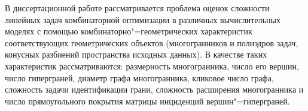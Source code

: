 
%
%



В диссертационной работе рассматривается проблема оценок сложности линейных задач комбинаторной оптимизации в различных вычислительных моделях с помощью комбинаторно"=геометрических характеристик соответствующих геометрических объектов (многогранников и полиэдров задач, конусных разбиений пространства исходных данных). В качестве таких характеристик рассматриваются: размерность многогранника, число его вершин, число гиперграней, диаметр графа многогранника, кликовое число графа, сложность задачи идентификации грани, сложность расширения многогранника и число прямоугольного покрытия матрицы инциденций вершин"=гиперграней.

